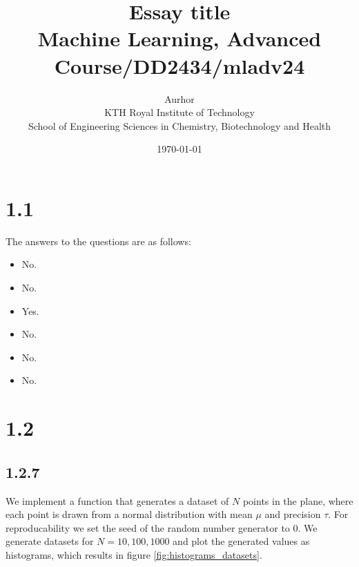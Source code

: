 \documentclass{article}
\title{Essay title\\\Large{Machine Learning, Advanced Course/DD2434/mladv24}}
\author{Aurhor \\ KTH Royal Institute of Technology\\ School of Engineering Sciences in Chemistry, Biotechnology and Health}
\date{\today}
\begin{document}
\maketitle

\fancyfoot[C]{\thepage}
\begin{multicols}{2}

    \section*{1.1}
    The answers to the questions are as follows:
    \begin{itemize}[noitemsep, topsep=0pt]
        \item No.
        \item No.
        \item Yes.
        \item No.
        \item No.
        \item No.
    \end{itemize}
    \section*{1.2}

    \subsection*{1.2.7}
    We implement a function that generates a dataset of $N$ points in the plane, where each point is drawn from a normal distribution with mean $\mu$ and precision $\tau$. For reproducability we set the seed of the random number generator to 0. We generate datasets for $N = 10, 100, 1000$ and plot the generated values as histograms, which results in figure \autoref{fig:histograms_datasets}. 


\end{multicols}
\end{document}
